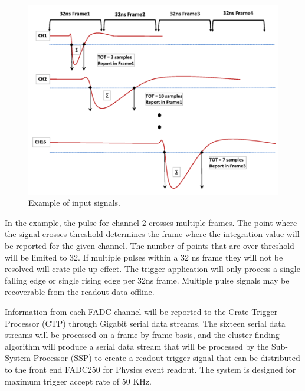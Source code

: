 \begin{figure}[t]
\includegraphics[scale=0.9]{test2012/trigger//trigger_pulse_samples}
\caption{\small{Example of input signals.}}\label{fig:trigsamples}
\end{figure}

In the example, the pulse for channel 2 crosses multiple frames.  The point where the signal crosses threshold determines the frame where the integration value will be reported for the given channel.  The number of points that are over threshold will be limited to 32. If multiple pulses within a 32 ns frame they will not be resolved will crate pile-up effect.  The trigger application will only process a single falling edge or single rising edge per 32ns frame.  Multiple pulse signals may be recoverable from the readout data offline.

Information from each FADC channel will be reported to the Crate Trigger Processor (CTP) through Gigabit serial data streams. The sixteen serial data streams will be processed on a frame by frame basis, and the cluster finding algorithm will produce a serial data stream that will be processed by the Sub-System Processor (SSP) to create a readout trigger signal that can be distributed to the front end FADC250 for Physics event readout. The system is designed for maximum trigger accept rate of 50 KHz. 
